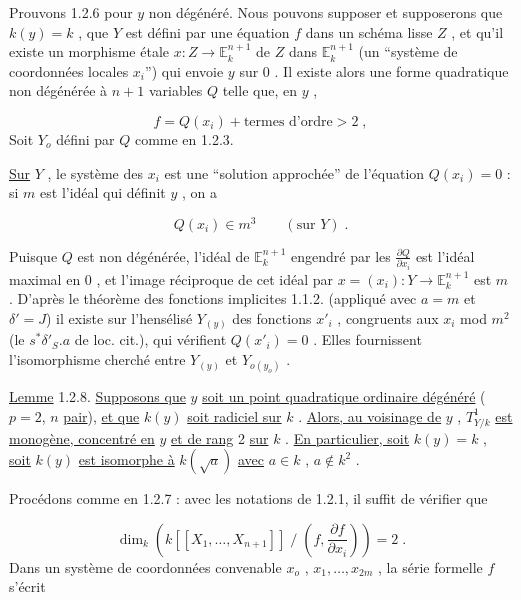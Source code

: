 Prouvons 1.2.6 pour $y$ non dégénéré. Nous pouvons supposer et supposerons que $k(y) = k$ , que $Y$ est défini par une équation $f$ dans un schéma lisse $Z$ , et qu'il existe un morphisme étale $x : Z \longrightarrow \mathbb{E}^{n+1}_k$ de $Z$ dans $\mathbb{E}^{n+1}_k$ (un ``système de coordonnées locales $x_i$'') qui envoie $y$ sur $0$ . Il existe alors une forme quadratique non dégénérée à $n+1$ variables $Q$ telle que, en $y$ ,

\begin{equation*}
f = Q(x_i) + \text{termes d'ordre} > 2 \;,
\end{equation*}
Soit $Y_o$ défini par $Q$ comme en 1.2.3.

\underline{Sur} $Y$ , le système des $x_i$ est une ``solution approchée'' de l'équation $Q(x_i) = 0$ : si $m$ est l'idéal qui définit $y$ , on a

\begin{equation*}
Q(x_i) \in m^3 \qquad (\text{sur } Y) \;.
\end{equation*}


Puisque $Q$ est non dégénérée, l'idéal de $\mathbb{E}^{n+1}_k$ engendré par les $\frac{\partial Q}{\partial x_i}$ est l'idéal maximal en $0$ , et l'image réciproque de cet idéal par $x = (x_i) : Y \longrightarrow \mathbb{E}^{n+1}_k$ est $m$ . D'après le théorème des fonctions implicites 1.1.2. (appliqué avec $a = m$ et $\delta' = J$) il existe sur l'hensélisé $Y_{(y)}$ des fonctions $x'_i$ , congruents aux $x_i$ mod $m^2$ (le $s^*\delta'_S.a$ de loc. cit.), qui vérifient $Q(x'_i) = 0$ . Elles fournissent l'isomorphisme cherché entre $Y_{(y)}$ et $Y_{o(y_o)}$ .

\underline{Lemme} 1.2.8. \underline{Supposons que} $y$ \underline{soit un point quadratique ordinaire dégénéré} ($p = 2$, $n$ \underline{pair}), \underline{et que} $k(y)$ \underline{soit radiciel sur} $k$ . \underline{Alors, au voisinage de} $y$ , $T^1_{Y/k}$ \underline{est monogène, concentré en} $y$ \underline{et de rang} 2 \underline{sur} $k$ . \underline{En particulier, soit} $k(y) = k$ , \underline{soit} $k(y)$ \underline{est isomorphe à} $k(\sqrt{a})$ \underline{avec} $a \in k$ , $a \notin k^2$ .

Procédons comme en 1.2.7 : avec les notations de 1.2.1, il suffit de vérifier que

\begin{equation*}
\dim_k(k[[X_1,\ldots,X_{n+1}]] \;/\; (f,\frac{\partial f}{\partial x_i})) = 2 \;.
\end{equation*}
Dans un système de coordonnées convenable $x_o$ , $x_1,\ldots,x_{2m}$ , la série formelle $f$ s'écrit

